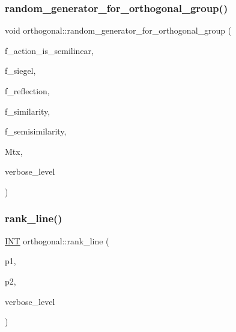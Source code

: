 \subsubsection{\texorpdfstring{random\+\_\+generator\+\_\+for\+\_\+orthogonal\+\_\+group()}{random\_generator\_for\_orthogonal\_group()}}
{\footnotesize\ttfamily void orthogonal\+::random\+\_\+generator\+\_\+for\+\_\+orthogonal\+\_\+group (\begin{DoxyParamCaption}\item[{\mbox{\hyperlink{galois_8h_a09fddde158a3a20bd2dcadb609de11dc}{I\+NT}}}]{f\+\_\+action\+\_\+is\+\_\+semilinear,  }\item[{\mbox{\hyperlink{galois_8h_a09fddde158a3a20bd2dcadb609de11dc}{I\+NT}}}]{f\+\_\+siegel,  }\item[{\mbox{\hyperlink{galois_8h_a09fddde158a3a20bd2dcadb609de11dc}{I\+NT}}}]{f\+\_\+reflection,  }\item[{\mbox{\hyperlink{galois_8h_a09fddde158a3a20bd2dcadb609de11dc}{I\+NT}}}]{f\+\_\+similarity,  }\item[{\mbox{\hyperlink{galois_8h_a09fddde158a3a20bd2dcadb609de11dc}{I\+NT}}}]{f\+\_\+semisimilarity,  }\item[{\mbox{\hyperlink{galois_8h_a09fddde158a3a20bd2dcadb609de11dc}{I\+NT}} $\ast$}]{Mtx,  }\item[{\mbox{\hyperlink{galois_8h_a09fddde158a3a20bd2dcadb609de11dc}{I\+NT}}}]{verbose\+\_\+level }\end{DoxyParamCaption})}

\mbox{\label{classorthogonal_a5e1b5a3eb76840f425e71f25dabcd470}} 
\subsubsection{\texorpdfstring{rank\+\_\+line()}{rank\_line()}}
{\footnotesize\ttfamily \mbox{\hyperlink{galois_8h_a09fddde158a3a20bd2dcadb609de11dc}{I\+NT}} orthogonal\+::rank\+\_\+line (\begin{DoxyParamCaption}\item[{\mbox{\hyperlink{galois_8h_a09fddde158a3a20bd2dcadb609de11dc}{I\+NT}}}]{p1,  }\item[{\mbox{\hyperlink{galois_8h_a09fddde158a3a20bd2dcadb609de11dc}{I\+NT}}}]{p2,  }\item[{\mbox{\hyperlink{galois_8h_a09fddde158a3a20bd2dcadb609de11dc}{I\+NT}}}]{verbose\+\_\+level }\end{DoxyParamCaption})}

